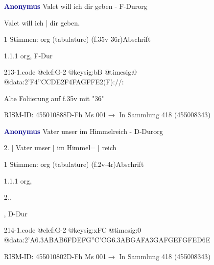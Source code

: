 \documentclass[twocolumn, 12pt]{book}
\begin{document}
\par \vspace{16pt} \textcolor{darkblue}{\textbf{Anonymus  }}\hfillplus{\textbf{[213]}}\newline Valet will ich dir geben - F-Dur\newline org
\par \begin{itshape}[f.35v, at left:] Valet will ich | dir geben.\end{itshape} 
\par \textcolor{darkblue}{}  1 Stimmen: org (tabulature)  (f.35v-36r)\newline Abschrift
\par 1.1.1  org, F-Dur  
\begin{filecontents*}{213-1.code}
@clef:G-2
@keysig:bB
@timesig:0
@data:2'F4''CCDE2F4FAGFFE2(F)://:
\end{filecontents*}
\newline %
\par Alte Foliierung auf f.35v mit "36"
\par RISM-ID: 455010888\newline D-Fh  Ms 001\newline $\rightarrow$ In Sammlung 418 (455008343)
      
\par \vspace{16pt} \textcolor{darkblue}{\textbf{Anonymus  }}\hfillplus{\textbf{[214]}}\newline Vater unser im Himmelreich - D-Dur\newline org
\par \begin{itshape}[f.2v, at left:] 2. | Vater unser | im Himmel= | reich\end{itshape} 
\par \textcolor{darkblue}{}  1 Stimmen: org (tabulature)  (f.2v-4r)\newline Abschrift
\par 1.1.1  org, \begin{itshape}2..\end{itshape}, D-Dur  
\begin{filecontents*}{214-1.code}
@clef:G-2
@keysig:xFC
@timesig:0
@data:2'A{6.3ABAB}{6FDEF}{G''C'CG}{6.3ABGA}{FA}{3GAFG}{EFGF}{ED6E}
\end{filecontents*}
\newline %
\par RISM-ID: 455010802\newline D-Fh  Ms 001\newline $\rightarrow$ In Sammlung 418 (455008343)
      
\end{document}
